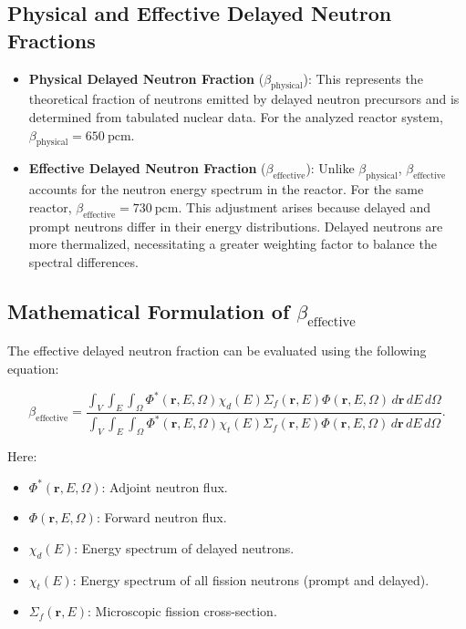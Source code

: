 \subsection{Physical and Effective Delayed Neutron Fractions}

\begin{itemize}
    \item \textbf{Physical Delayed Neutron Fraction} ($\beta_{\text{physical}}$): This represents the theoretical fraction of neutrons emitted by delayed neutron precursors and is determined from tabulated nuclear data. For the analyzed reactor system, $\beta_{\text{physical}} = 650 \ \text{pcm}$.
    \item \textbf{Effective Delayed Neutron Fraction} ($\beta_{\text{effective}}$): Unlike $\beta_{\text{physical}}$, $\beta_{\text{effective}}$ accounts for the neutron energy spectrum in the reactor. For the same reactor, $\beta_{\text{effective}} = 730 \ \text{pcm}$. This adjustment arises because delayed and prompt neutrons differ in their energy distributions. Delayed neutrons are more thermalized, necessitating a greater weighting factor to balance the spectral differences.
\end{itemize}

\subsection{Mathematical Formulation of \texorpdfstring{$\beta_{\text{effective}}$}{Beta-effective}}

The effective delayed neutron fraction can be evaluated using the following equation:

\[
\beta_{\text{effective}} = 
\frac{\int_V \int_E \int_\Omega \Phi^*(\mathbf{r}, E, \Omega) \chi_d(E) \Sigma_{f}(\mathbf{r}, E) \Phi(\mathbf{r}, E, \Omega) \, d\mathbf{r} \, dE \, d\Omega}
{\int_V \int_E \int_\Omega \Phi^*(\mathbf{r}, E, \Omega) \chi_t(E) \Sigma_{f}(\mathbf{r}, E) \Phi(\mathbf{r}, E, \Omega) \, d\mathbf{r} \, dE \, d\Omega}.
\]

Here:
\begin{itemize}
    \item $\Phi^*(\mathbf{r}, E, \Omega)$: Adjoint neutron flux.
    \item $\Phi(\mathbf{r}, E, \Omega)$: Forward neutron flux.
    \item $\chi_d(E)$: Energy spectrum of delayed neutrons.
    \item $\chi_t(E)$: Energy spectrum of all fission neutrons (prompt and delayed).
    \item $\Sigma_f(\mathbf{r}, E)$: Microscopic fission cross-section.
\end{itemize}

